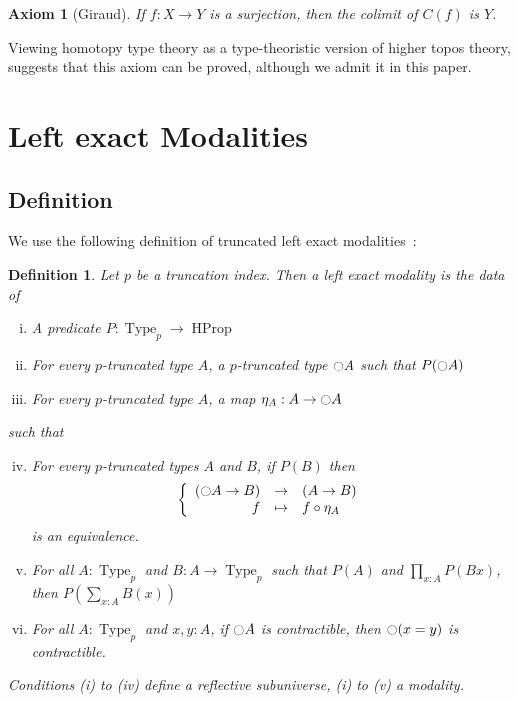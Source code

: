 \documentclass[conference]{IEEEtran}
\newtheorem{defi}[thm]{Definition}
\newtheorem{ax}[thm]{Axiom}
\DeclareMathOperator{\Type}{Type}
\DeclareMathOperator{\HProp}{HProp}
\newcommand{\modal}{\ensuremath{\ocircle}}
\begin{document}
\begin{ax}[Giraud]
  If $f:X\to Y$ is a surjection, then the
colimit of $C(f)$ is $Y$.
\end{ax}

Viewing homotopy type theory as a
type-theoristic version of higher topos theory, \cite{lurie} suggests that this
axiom can be proved, although we admit it in this paper.



\section{Left exact Modalities}
\label{sec:lexmod}

\cite{shulman-higher-modalities}

\subsection{Definition}

We use the following definition of truncated left exact modalities~:
\begin{defi}
  Let $p$ be a truncation index. Then a left exact modality is the
  data of
  \begin{enumerate}[(i)]
  \item A predicate $P:\Type_p \to \HProp$
  \item For every $p$-truncated type $A$, a $p$-truncated type
    $\modal A$ such that $P(\modal A)$
  \item For every $p$-truncated type $A$, a map $\eta_A:A \to
    \modal A$
  \end{enumerate}
  such that
  \begin{enumerate}[(i)]
    \setcounter{enumi}{3}
  \item For every $p$-truncated types $A$ and $B$, if $P(B)$ then
    $$\left\{
      \begin{array}{rcl}
        (\modal A \to B) & \to & (A \to B) \\
        f & \mapsto & f \circ \eta_A
      \end{array} \right.$$
    is an equivalence.
  \item For all $A:\Type_p$ and $B:A \to \Type_p$ such that $P(A)$
    and $\prod_{x:A} P(B x)$, then $P\left( \sum_{x:A} B(x)\right)$
  \item For all $A:\Type_p$ and $x,y:A$, if $\modal A$ is
    contractible, then $\modal (x=y)$ is contractible.
  \end{enumerate}
  Conditions (i) to (iv) define a {\em reflective subuniverse}, (i) to
  (v) a {\em modality}.
\end{defi}
\end{document}
